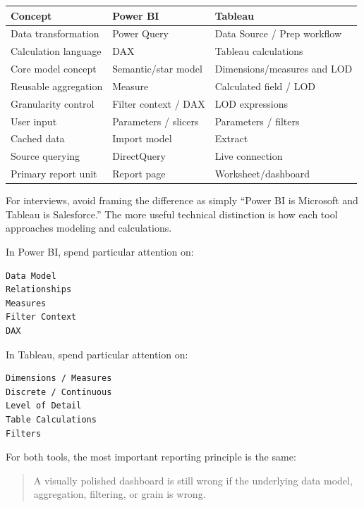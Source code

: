 \documentclass[11pt,letterpaper]{article}
\begin{document}
\begin{center}
\begin{tabularx}{\textwidth}{lXX}
\toprule
Concept & Power BI & Tableau \\
\midrule
Data transformation & Power Query & Data Source / Prep workflow \\
Calculation language & DAX & Tableau calculations \\
Core model concept & Semantic/star model & Dimensions/measures and LOD \\
Reusable aggregation & Measure & Calculated field / LOD \\
Granularity control & Filter context / DAX & LOD expressions \\
User input & Parameters / slicers & Parameters / filters \\
Cached data & Import model & Extract \\
Source querying & DirectQuery & Live connection \\
Primary report unit & Report page & Worksheet/dashboard \\
\bottomrule
\end{tabularx}
\end{center}

For interviews, avoid framing the difference as simply ``Power BI is Microsoft
and Tableau is Salesforce.'' The more useful technical distinction is how each
tool approaches modeling and calculations.

In Power BI, spend particular attention on:

\begin{lstlisting}
Data Model
Relationships
Measures
Filter Context
DAX
\end{lstlisting}

In Tableau, spend particular attention on:

\begin{lstlisting}
Dimensions / Measures
Discrete / Continuous
Level of Detail
Table Calculations
Filters
\end{lstlisting}

For both tools, the most important reporting principle is the same:

\begin{quote}
A visually polished dashboard is still wrong if the underlying data model,
aggregation, filtering, or grain is wrong.
\end{quote}


\end{document}
